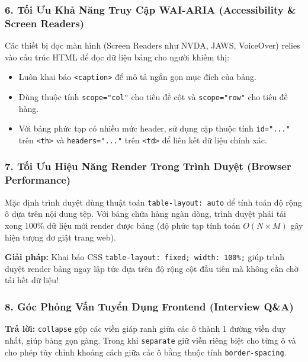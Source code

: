\documentclass[11pt,oneside]{book}
\newcommand{\codeinline}[1]{\textcolor{accentOrange}{\texttt{#1}}}
\begin{document}
\subsubsection{6. Tối Ưu Khả Năng Truy Cập WAI-ARIA (Accessibility \& Screen Readers)}

\begin{noteBox}
Các thiết bị đọc màn hình (Screen Readers như NVDA, JAWS, VoiceOver) relies vào cấu trúc HTML để đọc dữ liệu bảng cho người khiếm thị:
\begin{itemize}[leftmargin=1.5em, itemsep=2pt, parsep=0pt]
    \item Luôn khai báo \codeinline{<caption>} để mô tả ngắn gọn mục đích của bảng.
    \item Dùng thuộc tính \codeinline{scope="col"} cho tiêu đề cột và \codeinline{scope="row"} cho tiêu đề hàng.
    \item Với bảng phức tạp có nhiều mức header, sử dụng cặp thuộc tính \codeinline{id="..."} trên \codeinline{<th>} và \codeinline{headers="..."} trên \codeinline{<td>} để liên kết dữ liệu chính xác.
\end{itemize}
\end{noteBox}

\subsubsection{7. Tối Ưu Hiệu Năng Render Trong Trình Duyệt (Browser Performance)}

\begin{tipBox}
Mặc định trình duyệt dùng thuật toán \codeinline{table-layout: auto} để tính toán độ rộng ô dựa trên nội dung tệp. Với bảng chứa hàng ngàn dòng, trình duyệt phải tải xong 100\% dữ liệu mới render được bảng (độ phức tạp tính toán $O(N \times M)$ gây hiện tượng đơ giật trang web).

\textbf{Giải pháp:} Khai báo CSS \codeinline{table-layout: fixed; width: 100\%;} giúp trình duyệt render bảng ngay lập tức dựa trên độ rộng cột đầu tiên mà không cần chờ tải hết dữ liệu!
\end{tipBox}

\subsubsection{8. Góc Phỏng Vấn Tuyển Dụng Frontend (Interview Q\&A)}

\begin{conceptBox}
\textbf{Trả lời:} \codeinline{collapse} gộp các viền giáp ranh giữa các ô thành 1 đường viền duy nhất, giúp bảng gọn gàng. Trong khi \codeinline{separate} giữ viền riêng biệt cho từng ô và cho phép tùy chỉnh khoảng cách giữa các ô bằng thuộc tính \codeinline{border-spacing}.
\end{conceptBox}
\end{document}
